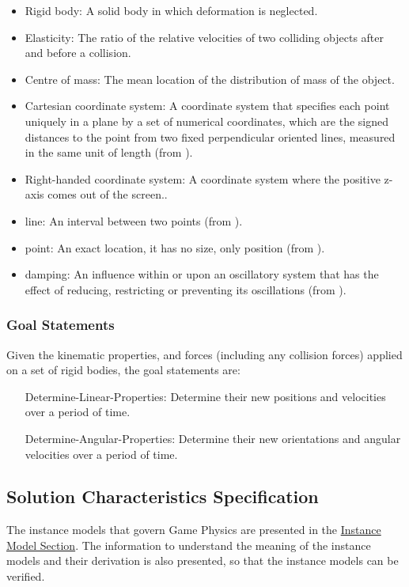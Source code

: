 \documentclass[12pt]{article}
\begin{document}
\begin{itemize}
\item{Rigid body: A solid body in which deformation is neglected.}
\item{Elasticity: The ratio of the relative velocities of two colliding objects after and before a collision.}
\item{Centre of mass: The mean location of the distribution of mass of the object.}
\item{Cartesian coordinate system: A coordinate system that specifies each point uniquely in a plane by a set of numerical coordinates, which are the signed distances to the point from two fixed perpendicular oriented lines, measured in the same unit of length (from \cite{cartesianWiki}).}
\item{Right-handed coordinate system: A coordinate system where the positive z-axis comes out of the screen..}
\item{line: An interval between two points (from \cite{lineSource}).}
\item{point: An exact location, it has no size, only position (from \cite{pointSource}).}
\item{damping: An influence within or upon an oscillatory system that has the effect of reducing, restricting or preventing its oscillations (from \cite{dampingSource}).}
\end{itemize}
\subsubsection{Goal Statements}
\label{Sec:GoalStmt}
Given the kinematic properties, and forces (including any collision forces) applied on a set of rigid bodies, the goal statements are:

\begin{itemize}
\item[Determine-Linear-Properties:\phantomsection\label{linearGS}]{Determine their new positions and velocities over a period of time.}
\item[Determine-Angular-Properties:\phantomsection\label{angularGS}]{Determine their new orientations and angular velocities over a period of time.}
\end{itemize}
\subsection{Solution Characteristics Specification}
\label{Sec:SolCharSpec}
The instance models that govern Game Physics are presented in the \hyperref[Sec:IMs]{Instance Model Section}. The information to understand the meaning of the instance models and their derivation is also presented, so that the instance models can be verified.
\end{document}
